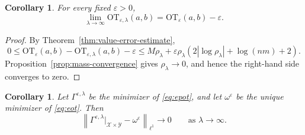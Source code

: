 \documentclass[a4paper,11pt]{article}
\numberwithin{equation}{section}
\newtheorem{cor}[thm]{Corollary}
\newcommand{\eps}{\varepsilon}
\newcommand{\OT}{\mathrm{OT}}
\newcommand{\X}{\mathcal{X}}
\newcommand{\Y}{\mathcal{Y}}
\begin{document}
\begin{cor}\label{cor:value-convergence}
For every fixed $\eps>0$,
\begin{equation}\label{eq:value-convergence}
  \lim_{\lambda\to\infty}\OT_{\eps,\lambda}(a,b) = \OT_{\eps}(a,b)-\eps.
\end{equation}
\end{cor}

\begin{proof}
By Theorem~\ref{thm:value-error-estimate},
\begin{equation*}
  0 \leq \OT_{\eps}(a,b) - \OT_{\eps,\lambda}(a,b) -\eps \leq M\rho_{\lambda}+\eps\rho_{\lambda}\left(2|\log\rho_{\lambda}|+\log(nm)+2\right).
\end{equation*}
Proposition~\ref{prop:mass-convergence} gives $\rho_{\lambda}\to0$, and hence the right-hand side converges to zero.
\end{proof}


\begin{cor}\label{cor:plan-convergence}
Let $\Gamma^{\eps,\lambda}$ be the minimizer of \eqref{eq:epot}, and let $\omega^\eps$ be the unique minimizer of \eqref{eq:eot}. Then
\begin{equation*}
  \left\|\Gamma^{\eps,\lambda}|_{\X\times\Y}-\omega^\eps\right\|_{\ell^1}\to0
  \qquad\text{as }\lambda\to\infty.
\end{equation*}
\end{cor}
\end{document}

